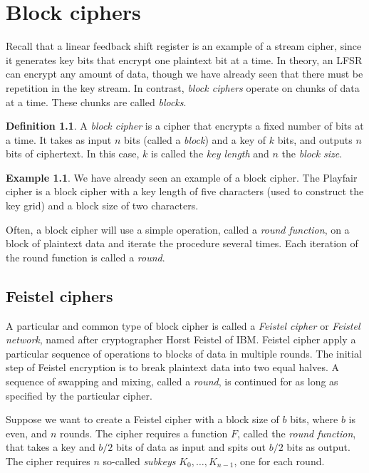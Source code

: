 \documentclass{book}
\theoremstyle{plain}
\theoremstyle{definition}
\newtheorem{definition}[theorem]{Definition}
\newtheorem{example}[theorem]{Example}
\begin{document}
\chapter{Block ciphers}
Recall that a linear feedback shift register is an example of a stream cipher, since it generates key bits that encrypt one plaintext bit at a time. In theory, an LFSR can encrypt any amount of data, though we have already seen that there must be repetition in the key stream. In contrast, {\it block ciphers} operate on chunks of data at a time. These chunks are called {\it blocks}.

\begin{definition}
A {\it block cipher} is a cipher that encrypts a fixed number of bits at a time. It takes as input $n$ bits (called a {\it block}) and a key of $k$ bits, and outputs $n$ bits of ciphertext. In this case, $k$ is called the {\it key length} and $n$ the {\it block size}.
\end{definition}

\begin{example}
We have already seen an example of a block cipher. The Playfair cipher is a block cipher with a key length of five characters (used to construct the key grid) and a block size of two characters.
\end{example}

Often, a block cipher will use a simple operation, called a {\it round function}, on a block of plaintext data and iterate the procedure several times. Each iteration of the round function is called a {\it round}.

\section{Feistel ciphers}
A particular and common type of block cipher is called a {\it Feistel cipher} or {\it Feistel network}, named after cryptographer Horst Feistel of IBM. Feistel cipher apply a particular sequence of operations to blocks of data in multiple rounds. The initial step of Feistel encryption is to break plaintext data into two equal halves. A sequence of swapping and mixing, called a {\it round}, is continued for as long as specified by the particular cipher.

Suppose we want to create a Feistel cipher with a block size of $b$ bits, where $b$ is even, and $n$ rounds. The cipher requires a function $F$, called the {\it round function}, that takes a key and $b/2$ bits of data as input and spits out $b/2$ bits as output. The cipher requires $n$ so-called {\it subkeys} $K_0,\ldots,K_{n-1}$, one for each round.
\end{document}
